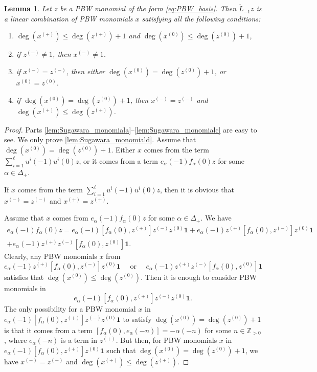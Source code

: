 \documentclass[11pt]{article}
\numberwithin{equation}{section}
\newenvironment{enumeratea}
{\bgroup\def\theenumi{\alph{enumi}}\begin{enumerate}}
{\end{enumerate}\egroup}
\let\al\alpha
\newcommand\Z{{\mathbb Z}}
\newtheorem{lem}[theorem]{Lemma}
\theoremstyle{definition}
\begin{document}
\begin{lem}
\label{lem:Sugawara_monomial}
Let $z$ be a PBW monomial of the form \eqref{eq:PBW_basis}.
Then $\tilde L_{-1} z$
is a linear combination of PBW monomials
$x$ satisfying all the following conditions:
\begin{enumeratea}
\item\label{lem:Sugawara_monomiala}
$\deg(x^{(+)}) \leq \deg(z^{(+)})+1$ and $\deg(x^{(0)}) \leq \deg(z^{(0)})+1$,
\item\label{lem:Sugawara_monomialb}
if $z^{(-)}\neq 1$, then $x^{(-)}\neq 1$.
\item\label{lem:Sugawara_monomialc}
if $x^{(-)}=z^{(-)}$, then either $\deg(x^{(0)}) =\deg(z^{(0)}) +1$, or $x^{(0)} = z^{(0)}$.
\item\label{lem:Sugawara_monomiald}
if $\deg(x^{(0)}) =\deg(z^{(0)}) +1$, then $x^{(-)}= z^{(-)}$ and $\deg(x^{(+)}) \leq \deg(z^{(+)})$.
\end{enumeratea}
\end{lem}
\begin{proof}
Parts \eqref{lem:Sugawara_monomiala}--\eqref{lem:Sugawara_monomialc} are easy to see. We only prove \eqref{lem:Sugawara_monomiald}. Assume that $\deg(x^{(0)}) =\deg(z^{(0)}) +1$.
Either $x$ comes from the term $\sum_{i=1}^{\ell} u^i(-1)u^i(0) z$,
or it comes from a term $e_{\al}(-1)f_{\al}(0)z$ for some $\al \in \Delta_+$.

If $x$ comes from the term $\sum_{i=1}^{\ell} u^i(-1)u^i(0) z$, then it is obvious that
$x^{(-)}= z^{(-)}$ and $x^{(+)} = z^{(+)}$.

Assume that $x$ comes from $e_{\al}(-1)f_{\al}(0)z$ for some $\al \in \Delta_+$.
We have
\begin{multline*}
e_{\al}(-1)f_{\al}(0)z = e_{\al}(-1) [f_{\al}(0), z^{(+)}]z^{(-)}z^{(0)}\mathbf{1} + e_{\al}(-1)z^{(+)}[f_{\al}(0), z^{(-)}]z^{(0)} \mathbf{1} \\
+ e_{\al}(-1)z^{(+)} z^{(-)}[f_{\al}(0),z^{(0)} ] \mathbf{1}.
\end{multline*}
Clearly, any PBW monomials $x$ from
\[
e_{\al}(-1)z^{(+)}[f_{\al}(0), z^{(-)}]z^{(0)} \mathbf{1} \quad \text{ or }
\quad e_{\al}(-1)z^{(+)} z^{(-)}[f_{\al}(0),z^{(0)} ] \mathbf{1}
\]
satisfies that $\deg(x^{(0)}) \leq \deg(z^{(0)})$. Then it is enough to consider PBW monomials in
\[
e_{\al}(-1) [f_{\al}(0), z^{(+)}]z^{(-)}z^{(0)}\mathbf{1}.
\]
The only possibility for a PBW monomial $x$ in $ e_{\al}(-1) [f_{\al}(0), z^{(+)}]z^{(-)}z^{(0)}\mathbf{1}$
to satisfy $\deg(x^{(0)}) =\deg(z^{(0)}) +1$ is that it comes from a term
$ [f_{\al}(0), e_{\al}(-n)]= - \al(-n)$ for some $n \in \Z_{>0}$, where
$e_{\al}(-n)$ is a term in $z^{(+)}$.
But then, for PBW monomials $x$ in
$ e_{\al}(-1)[f_{\al}(0), z^{(+)}]z^{(0)}\mathbf{1}$
such that $\deg(x^{(0)}) =\deg(z^{(0)}) +1$,
we have $x^{(-)}=z^{(-)}$ and $\deg(x^{(+)}) \leq \deg(z^{(+)})$.
\end{proof}
\end{document}
